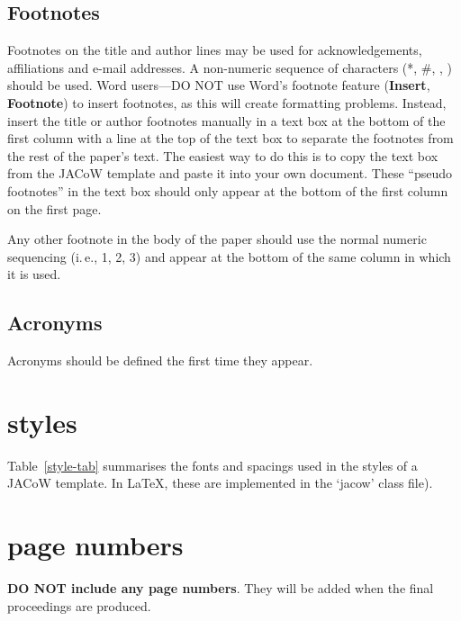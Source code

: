 \documentclass[a4paper,
              ]{jacow}
\begin{document}
\subsection{Footnotes}

Footnotes on the title and author lines may be used for acknowledgements,
affiliations and e-mail addresses. A non-numeric sequence of characters (*, \#,
\dag, \ddag) should be used.
Word users---DO NOT use Word's footnote feature (\textbf{Insert}, \textbf{Footnote})
to insert footnotes, as this will create formatting problems. Instead, insert
the title or author footnotes manually in a text box at the bottom of the first column with a
line at the top of the text box to separate the footnotes from the rest of
the paper's text.  The easiest way to do this is to copy the text box from
the JACoW template and paste it into your own document.
These “pseudo footnotes” in the text box should only
appear at the bottom of the first column on the first page.

Any other footnote in the body of the paper should
use the normal numeric sequencing (i.\,e., 1, 2, 3)
and appear at the bottom of the same column in which
it is used.

\subsection{Acronyms}

Acronyms should be defined the first time they appear.

\section{styles}

Table~\ref{style-tab} summarises the fonts and spacings used in the styles of
a JACoW template. In \LaTeX, these are implemented in the ‘jacow’ class file).

\section{page numbers}

\textbf{DO NOT include any page numbers}. They will be added
when the final proceedings are produced.
\end{document}

